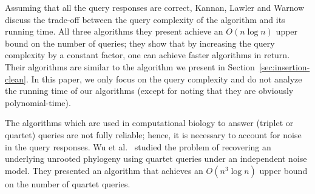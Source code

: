 Assuming that all the query responses are correct,
Kannan, Lawler and Warnow~\cite{kannan-lawler-warnow:1996:phylogeny-triplet}
discuss the trade-off between the query complexity of the algorithm
and its running time. 
All three algorithms they present
achieve an $O(n \log n)$ upper bound on the number of queries;
they show that by increasing the query complexity
by a constant factor, one can achieve faster algorithms in return.
Their algorithms are similar to
the algorithm we present in Section~\ref{sec:insertion-clean}.
In this paper, we only focus on the query complexity
and do not analyze the running time of our algorithms
(except for noting that they are obviously polynomial-time).

The algorithms which are used in computational biology
to answer (triplet or quartet) queries
are not fully reliable;
hence, it is necessary to account for noise in the 
query responses.
Wu et al.~\cite{wu-kao-lin-you:2008:pylogeny-noisy}
studied the problem of recovering an underlying unrooted phylogeny
using quartet queries under an independent noise model.
They presented an algorithm that achieves an $O(n^3 \log n)$ upper
bound on the number of quartet queries.

